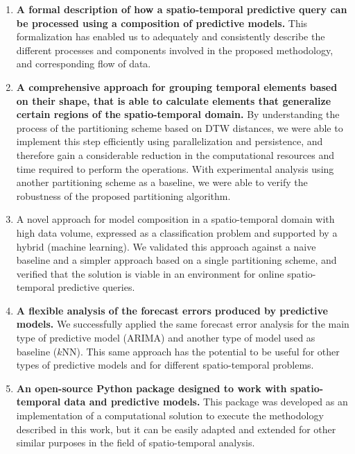 \begin{enumerate}

\item \textbf{A formal description of how a spatio-temporal predictive query can be processed using a composition of predictive models.} This formalization has enabled us to adequately and consistently describe the different processes and components involved in the proposed methodology, and corresponding flow of data.

\item \textbf{A comprehensive approach for grouping temporal elements based on their shape, that is able to calculate elements that generalize certain regions of the spatio-temporal domain.} By understanding the process of the partitioning scheme based on DTW distances, we were able to implement this step efficiently using parallelization and persistence, and therefore gain a considerable reduction in the computational resources and time required to perform the operations. With experimental analysis using another partitioning scheme as a baseline, we were able to verify the robustness of the proposed partitioning algorithm.

\item A novel approach for model composition in a spatio-temporal domain with high data volume, expressed as a classification problem and supported by a hybrid (machine learning). We validated this approach against a naive baseline and a simpler approach based on a single partitioning scheme, and verified that the solution is viable in an environment for online spatio-temporal predictive queries.

\item \textbf{A flexible analysis of the forecast errors produced by predictive models.} We successfully applied the same forecast error analysis for the main type of predictive model (ARIMA) and another type of model used as baseline ($k$NN). This same approach has the potential to be useful for other types of predictive models and for different spatio-temporal problems.

\item \textbf{An open-source Python package designed to work with spatio-temporal data and predictive models.} This package was developed as an implementation of a computational solution to execute the methodology described in this work, but it can be easily adapted and extended for other similar purposes in the field of spatio-temporal analysis.

\end{enumerate}

